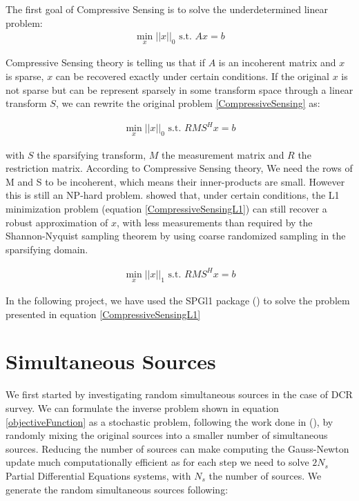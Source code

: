 \documentclass[twoside]{article}
\begin{document}
The first goal of Compressive Sensing is to solve the underdetermined linear problem:
\begin{align}
\min_x ||x||_0 \text{ s.t. } Ax=b  \label{CompressiveSensing}
\end{align}

Compressive Sensing theory is telling us that if $A$ is an incoherent matrix and $x$ is sparse, $x$ can be recovered exactly under certain conditions. If the original $x$ is not sparse but can be represent sparsely in some transform space through a linear transform $S$, we can rewrite the original problem \ref{CompressiveSensing} as:

\begin{align}
\min_x ||x||_0 \text{ s.t. } RMS^Hx=b
\end{align}

with $S$ the sparsifying transform, $M$ the measurement matrix and $R$ the restriction matrix. According to Compressive Sensing theory, We need the rows of M and S to be incoherent, which means their inner-products are small. However this is still an NP-hard problem. \cite{CRT:2006} showed that, under certain conditions, the L1 minimization problem (equation \ref{CompressiveSensingL1}) can still recover a robust approximation of $x$, with less measurements than required by the Shannon-Nyquist sampling theorem by using coarse randomized sampling in the sparsifying domain.

\begin{align}
\min_x ||x||_1 \text{ s.t. } RMS^Hx=b  \label{CompressiveSensingL1}
\end{align}

In the following project, we have used the SPGl1 package (\cite{BF:2008}) to solve the problem presented in equation \ref{CompressiveSensingL1}

\newpage

\section{Simultaneous Sources}

We first started by investigating random simultaneous sources in the case of DCR survey. We can formulate the inverse problem shown in equation \ref{objectiveFunction} as a stochastic problem, following the work done in (\cite{HCH:2012}), by randomly mixing the original sources into a smaller number of simultaneous sources. Reducing the number of sources can make computing the Gauss-Newton update much computationally efficient as for each step we need to solve $2N_s$ Partial Differential Equations systems, with $N_s$ the number of sources. We generate the random simultaneous sources following: 
\end{document}
